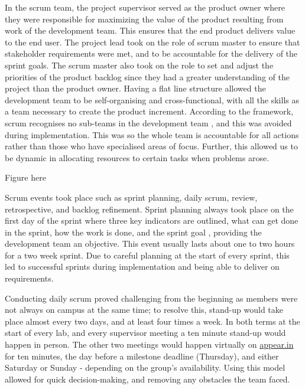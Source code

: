 In the scrum team, the project supervisor served as the product owner where they were responsible for maximizing the value of the product resulting from work of the development team. This ensures that the end product delivers value to the end user. The project lead took on the role of scrum master to ensure that stakeholder requirements were met, and to be accountable for the delivery of the sprint goals. The scrum master also took on the role to set and adjust the priorities of the product backlog since they had a greater understanding of the project than the product owner. Having a flat line structure allowed the development team to be self-organising and cross-functional, with all the skills as a team necessary to create the product increment. According to the framework, scrum recognises no sub-teams in the development team \cite{schwaber}, and this was avoided during implementation. This was so the whole team is accountable for all actions rather than those who have specialised areas of focus. Further, this allowed us to be dynamic in allocating resources to certain tasks when problems arose.

Figure here


Scrum events took place such as sprint planning, daily scrum, review, retrospective, and backlog refinement. Sprint planning always took place on the first day of the sprint where three key indicators are outlined, what can get done in the sprint, how the work is done, and the sprint goal \cite{schwaber}, providing the development team an objective. This event usually lasts about one to two hours for a two week sprint. Due to careful planning at the start of every sprint, this led to successful sprints during implementation and being able to deliver on requirements.

Conducting daily scrum proved challenging from the beginning as members were not always on campus at the same time; to resolve this, stand-up would take place almost every two days, and at least four times a week. In both terms at the start of every lab, and every supervisor meeting a ten minute stand-up would happen in person. The other two meetings would happen virtually on \url{appear.in} for ten minutes, the day before a milestone deadline (Thursday), and either Saturday or Sunday - depending on the group's availability. Using this model allowed for quick decision-making, and removing any obstacles the team faced.

